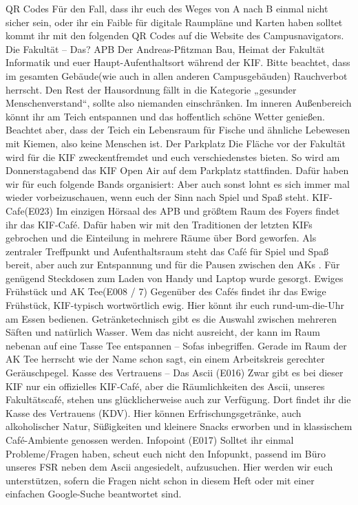 QR Codes
Für den Fall, dass ihr euch des Weges von A nach B einmal nicht sicher sein, oder ihr ein Faible für digitale Raumpläne und Karten haben solltet kommt ihr mit den folgenden QR Codes auf die Website des Campusnavigators.
Die Fakultät – Das? APB
Der Andreas-Pfitzman Bau, Heimat der Fakultät Informatik und euer Haupt-Aufenthaltsort während der KIF. Bitte beachtet, dass im gesamten Gebäude(wie auch in allen anderen Campusgebäuden) Rauchverbot herrscht. Den Rest der Hausordnung fällt in die Kategorie „gesunder Menschenverstand“, sollte also niemanden einschränken. 
Im inneren Außenbereich könnt ihr am Teich entspannen und das hoffentlich schöne Wetter genießen. Beachtet aber, dass der Teich ein Lebensraum für Fische und ähnliche Lebewesen mit Kiemen, also keine Menschen ist.
Der Parkplatz 
Die Fläche vor der  Fakultät wird für die KIF zweckentfremdet und euch verschiedenstes bieten.  So wird am Donnerstagabend das KIF Open Air auf dem Parkplatz stattfinden. Dafür haben wir für euch folgende Bands organisiert: 
Aber auch sonst lohnt es sich immer mal wieder vorbeizuschauen, wenn euch der Sinn nach Spiel und Spaß steht. 
KIF-Cafe(E023)
Im einzigen Hörsaal des APB und größtem Raum des Foyers findet ihr das KIF-Café. Dafür haben wir mit den Traditionen der letzten KIFs gebrochen und die Einteilung in mehrere Räume über Bord geworfen. Als zentraler Treffpunkt und Aufenthaltsraum steht das Café für Spiel und Spaß bereit, aber auch zur Entspannung und für die Pausen zwischen den AKs . Für genügend Steckdosen zum Laden von Handy und Laptop wurde gesorgt.
Ewiges Frühstück und AK Tee(E008 / 7)
Gegenüber des Cafés findet ihr das Ewige Frühstück, KIF-typisch wortwörtlich ewig. Hier könnt ihr euch rund-um-die-Uhr am Essen bedienen. Getränketechnisch gibt es die Auswahl zwischen mehreren Säften und natürlich Wasser. Wem das nicht ausreicht, der kann im Raum nebenan auf eine Tasse Tee entspannen – Sofas inbegriffen. Gerade im Raum der AK Tee herrscht wie der Name schon sagt, ein einem Arbeitskreis gerechter Geräuschpegel.
Kasse des Vertrauens – Das Ascii (E016)
Zwar gibt es bei dieser KIF nur ein offizielles KIF-Café, aber die Räumlichkeiten des  Ascii, unseres Fakultätscafé, stehen uns glücklicherweise auch zur Verfügung. Dort findet ihr die Kasse des Vertrauens (KDV). Hier können Erfrischungsgetränke, auch alkoholischer Natur, Süßigkeiten und kleinere Snacks erworben und in klassischem Café-Ambiente genossen werden. 
Infopoint (E017)
Solltet ihr einmal Probleme/Fragen haben, scheut euch nicht den Infopunkt, passend im Büro unseres FSR neben dem Ascii angesiedelt, aufzusuchen. Hier werden wir euch unterstützen, sofern die Fragen nicht schon in diesem Heft oder mit einer einfachen Google-Suche beantwortet sind.
